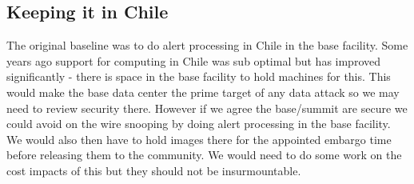 \subsection{Keeping it in Chile}\label{sec:chile}
The original baseline was to do alert processing in Chile in the base facility. Some years ago support for computing in Chile was sub optimal but has improved significantly - there is space in the base facility to hold machines for this.
This would make the base data center the prime target of any data  attack so we may need to review security there.
However if we agree the base/summit are secure we could avoid on the wire snooping by doing alert processing in the base facility. We would also then have to hold images there for the appointed embargo time  before releasing them to the community. We would need to do some work on the cost impacts of this but they should not be insurmountable.



